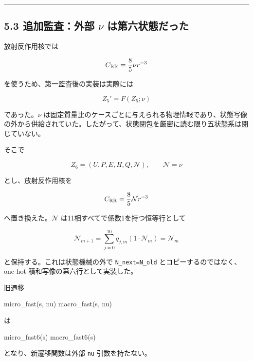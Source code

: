 \documentclass[
  a4paper,
]{ltjsarticle}
\newenvironment{Shaded}{}{}
\newcommand{\NormalTok}[1]{#1}
\begin{document}
\begin{center}\rule{0.5\linewidth}{0.5pt}\end{center}

\subsection{\texorpdfstring{5.3 追加監査：外部 \(\nu\)
は第六状態だった}{5.3 追加監査：外部 \textbackslash nu は第六状態だった}}\label{ux8ffdux52a0ux76e3ux67fbux5916ux90e8-nu-ux306fux7b2cux516dux72b6ux614bux3060ux3063ux305f}

放射反作用核では

\[
C_{\rm RR}=\frac85\nu r^{-3}
\]

を使うため、第一監査後の実装は実際には

\[
\boxed{Z_5'=F(Z_5;\nu)}
\]

であった。\(\nu\)
は固定質量比のケースごとに与えられる物理情報であり、状態写像の外から供給されていた。したがって、状態閉包を厳密に読む限り五状態系は閉じていない。

そこで

\[
\boxed{
Z_6=(U,P,E,H,Q,\mathcal N),
\qquad
\mathcal N=\nu
}
\]

とし、放射反作用核を

\[
C_{\rm RR}=\frac85\mathcal N r^{-3}
\]

へ置き換えた。\(\mathcal N\) は11相すべてで係数1を持つ恒等行として

\[
\boxed{
\mathcal N_{m+1}
=
\sum_{j=0}^{10}q_{j,m}(1\cdot\mathcal N_m)
=
\mathcal N_m
}
\]

と保持する。これは状態機械の外で \texttt{N\_next=N\_old}
とコピーするのではなく、one-hot 積和写像の第六行として実装した。

旧遷移

\begin{Shaded}
\begin{Highlighting}[]
\NormalTok{micro\_fast(s, nu)}
\NormalTok{macro\_fast(s, nu)}
\end{Highlighting}
\end{Shaded}

は

\begin{Shaded}
\begin{Highlighting}[]
\NormalTok{micro\_fast6(s)}
\NormalTok{macro\_fast6(s)}
\end{Highlighting}
\end{Shaded}

となり、新遷移関数は外部 \texttt{nu} 引数を持たない。
\end{document}
